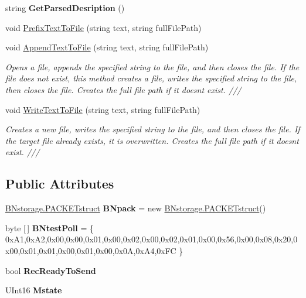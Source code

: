 \begin{DoxyCompactItemize}
string {\bfseries Get\+Parsed\+Desription} ()
\item 
void \mbox{\hyperlink{class_b_n_a30_1_1_b_nplus_master_slave_aee1ab8ce47fbe22ba6a7fe6da4c31358}{Prefix\+Text\+To\+File}} (string text, string full\+File\+Path)
\item 
void \mbox{\hyperlink{class_b_n_a30_1_1_b_nplus_master_slave_a8192fedb382985fa67387f75f164f41c}{Append\+Text\+To\+File}} (string text, string full\+File\+Path)
\begin{DoxyCompactList}\small\item\em Opens a file, appends the specified string to the file, and then closes the file. If the file does not exist, this method creates a file, writes the specified string to the file, then closes the file. Creates the full file path if it doesn\textquotesingle{}t exist. /// \end{DoxyCompactList}\item 
void \mbox{\hyperlink{class_b_n_a30_1_1_b_nplus_master_slave_a3cc9dd0ae5ab6c54e9d0d361be1bad8e}{Write\+Text\+To\+File}} (string text, string full\+File\+Path)
\begin{DoxyCompactList}\small\item\em Creates a new file, writes the specified string to the file, and then closes the file. If the target file already exists, it is overwritten. Creates the full file path if it doesn\textquotesingle{}t exist. /// \end{DoxyCompactList}\end{DoxyCompactItemize}
\subsection*{Public Attributes}
\begin{DoxyCompactItemize}
\item 
\mbox{\label{class_b_n_a30_1_1_b_nplus_master_slave_a5f45c393fce96881eeba4dc2e1985a4f}} 
\mbox{\hyperlink{struct_b_n_a30_1_1_b_nstorage_1_1_p_a_c_k_e_tstruct}{B\+Nstorage.\+P\+A\+C\+K\+E\+Tstruct}} {\bfseries B\+Npack} = new \mbox{\hyperlink{struct_b_n_a30_1_1_b_nstorage_1_1_p_a_c_k_e_tstruct}{B\+Nstorage.\+P\+A\+C\+K\+E\+Tstruct}}()
\item 
\mbox{\label{class_b_n_a30_1_1_b_nplus_master_slave_aa8acb85ebb8e874d21729ec98e1e4c69}} 
byte \mbox{[}$\,$\mbox{]} {\bfseries B\+Ntest\+Poll} = \{ 0x\+A1,0x\+A2,0x00,0x00,0x01,0x00,0x02,0x00,0x02,0x01,0x00,0x56,0x00,0x08,0x20,0x00,0x01,0x01,0x00,0x01,0x00,0x0\+A,0x\+A4,0x\+F\+C \}
\item 
\mbox{\label{class_b_n_a30_1_1_b_nplus_master_slave_acd5cc959c8f592e0527c648c88102c2d}} 
bool {\bfseries Rec\+Ready\+To\+Send}
\item 
\mbox{\label{class_b_n_a30_1_1_b_nplus_master_slave_a943122950452babce7d1aa62e10a8622}} 
U\+Int16 {\bfseries Mstate}
\end{DoxyCompactItemize}


